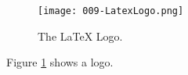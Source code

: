\documentclass{article}
\begin{document}
\begin{figure}
  \texttt{[image: 009-LatexLogo.png]}
  \caption{The LaTeX Logo.}
  \label{fig:logo1}
\end{figure}

Figure \ref{fig:logo1} shows a logo.
\end{document}
